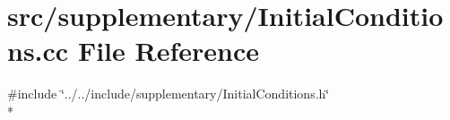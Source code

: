 \section{src/supplementary/\-Initial\-Conditions.cc File Reference}
\label{_initial_conditions_8cc}
{\ttfamily \#include \char`\"{}../../include/supplementary/\-Initial\-Conditions.\-h\char`\"{}}\\*
